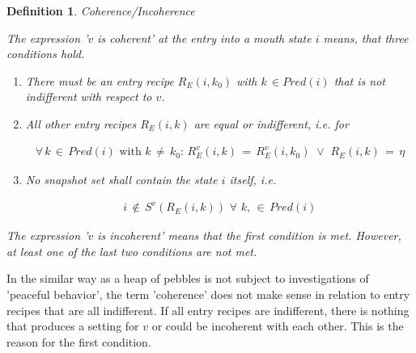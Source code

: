 \documentclass[12pt,a4paper]{scrartcl}
\newtheorem{definition}{Definition}
\begin{document}
\begin{definition} Coherence/Incoherence

    The expression '$v$ is coherent' at the entry into a mouth state $i$
    means, that three conditions hold. 

    \begin{enumerate}

    \item There must be an entry recipe $R_E(i,k_0)$ with $k\,\in Pred(i)$ 
          that is not indifferent with respect to $v$.

    \item All other entry recipes $R_E(i,k)$ are equal or indifferent, i.e. for 

        \begin{equation} \label{eq:definition-coherence}
            \begin{aligned}
                \forall\,k\,\in\,Pred(i)\,\,\mbox{with}\,\,k\,\neq\,k_0:\,R_E^v(i,k)\,=\,R_E^v(i,k_0)\,\,\vee\,\,R_E(i,k)\,=\,\eta
            \end{aligned}
        \end{equation}
        
    \item No snapshot set shall contain the state $i$ itself, i.e.

        \begin{equation} \label{eq:definition-coherence-2}
            \begin{aligned}
                i\,\notin\,S^v(R_E(i,k))\,\,\forall\,\,k,\,\in\,Pred(i)
            \end{aligned}
        \end{equation}

    \end{enumerate}
    
    The expression '$v$ is incoherent' means that the first condition is met.
    However, at least one of the last two conditions are not met.

\end{definition}

In the similar way as a heap of pebbles is not subject to investigations of
'peaceful behavior',  the term 'coherence' does not make sense in relation to 
entry recipes that are all indifferent. If all entry recipes are indifferent,
there is nothing that produces a setting for $v$ or could be incoherent with
each other. This is the reason for the first condition.
\end{document}
